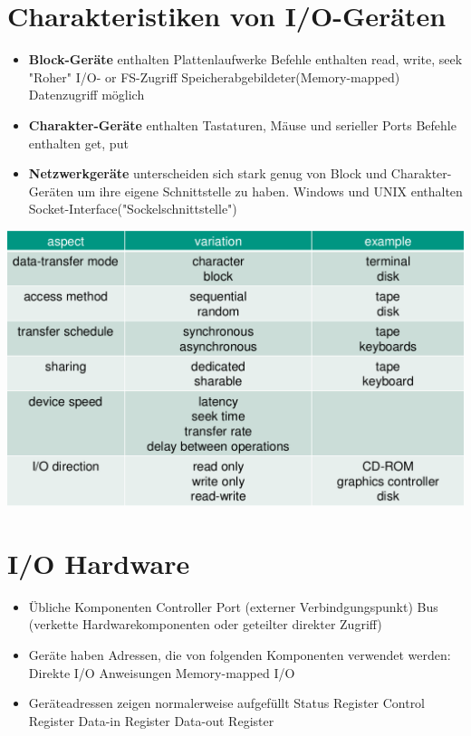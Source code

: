 \documentclass[a4paper]{scrreprt}
\begin{document}
\section{Charakteristiken von I/O-Geräten}
\begin{itemize}
	\item \textbf{Block-Geräte} enthalten Plattenlaufwerke
	\subitem Befehle enthalten read, write, seek
	\subitem "Roher" I/O- or FS-Zugriff
	\subitem Speicherabgebildeter(Memory-mapped) Datenzugriff möglich
	\item \textbf{Charakter-Geräte} enthalten Tastaturen, Mäuse und serieller Ports
	\subitem Befehle enthalten get, put
	\item \textbf{Netzwerkgeräte} unterscheiden sich stark genug von Block und Charakter-Geräten um ihre eigene Schnittstelle  zu haben.
	\subitem Windows und UNIX enthalten Socket-Interface("Sockelschnittstelle")
\end{itemize}
\includegraphics[scale=0.6]{graphics/chapter9_1.png}
\section{I/O Hardware}
\begin{itemize}
	\item Übliche Komponenten
		\subitem Controller
		\subitem Port (externer Verbindgungspunkt)
		\subitem Bus (verkette Hardwarekomponenten oder geteilter direkter Zugriff)
	\item Geräte haben Adressen, die von folgenden Komponenten verwendet werden:
		\subitem Direkte I/O Anweisungen 
		\subitem Memory-mapped I/O
	\item Geräteadressen zeigen normalerweise aufgefüllt	
		\subitem Status Register
		\subitem Control Register
		\subitem Data-in Register
		\subitem Data-out Register
\end{itemize}
\end{document}
